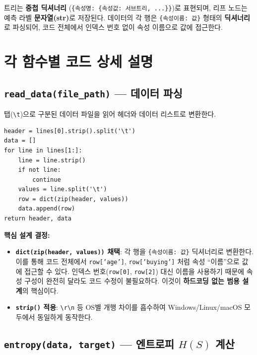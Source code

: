 \documentclass[12pt, a4paper]{article}
\begin{document}
트리는 \textbf{중첩 딕셔너리} (\texttt{\{속성명: \{속성값: 서브트리, ...\}\}})로 표현되며, 리프 노드는 예측 라벨 \textbf{문자열(str)}로 저장된다. 데이터의 각 행은 \texttt{\{속성이름: 값\}} 형태의 \textbf{딕셔너리}로 파싱되어, 코드 전체에서 인덱스 번호 없이 속성 이름으로 값에 접근한다.


\section{각 함수별 코드 상세 설명}

\subsection{\texttt{read\_data(file\_path)} --- 데이터 파싱}

탭(\texttt{\textbackslash t})으로 구분된 데이터 파일을 읽어 헤더와 데이터 리스트로 변환한다.

\begin{verbatim}
header = lines[0].strip().split('\t')
data = []
for line in lines[1:]:
    line = line.strip()
    if not line:
        continue
    values = line.split('\t')
    row = dict(zip(header, values))
    data.append(row)
return header, data
\end{verbatim}

\noindent\textbf{핵심 설계 결정:}
\begin{itemize}
    \item \textbf{\texttt{dict(zip(header, values))} 채택}: 각 행을 \texttt{\{속성이름: 값\}} 딕셔너리로 변환한다. 이를 통해 코드 전체에서 \texttt{row['age']}, \texttt{row['buying']} 처럼 속성 ``이름''으로 값에 접근할 수 있다. 인덱스 번호(\texttt{row[0]}, \texttt{row[2]}) 대신 이름을 사용하기 때문에 속성 구성이 완전히 달라도 코드 수정이 불필요하다. 이것이 \textbf{하드코딩 없는 범용 설계}의 핵심이다.
    \item \textbf{\texttt{strip()} 적용}: \texttt{\textbackslash r\textbackslash n} 등 OS별 개행 차이를 흡수하여 Windows/Linux/macOS 모두에서 동일하게 동작한다.
\end{itemize}


\subsection{\texttt{entropy(data, target)} --- 엔트로피 $H(S)$ 계산}
\end{document}
